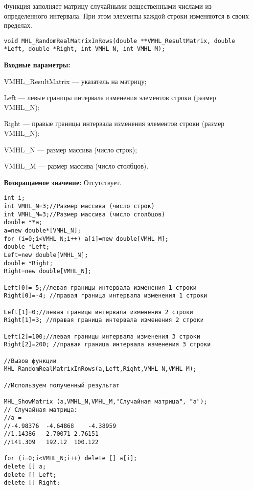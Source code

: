 \documentclass[a4paper,12pt]{article}
\begin{document}
Функция заполняет матрицу случайными вещественными числами из определенного интервала. При этом элементы каждой строки изменяются в своих пределах.


\begin{lstlisting}[label=code_syntax_MHL_RandomRealMatrixInRows,caption=Синтаксис]
void MHL_RandomRealMatrixInRows(double **VMHL_ResultMatrix, double *Left, double *Right, int VMHL_N, int VMHL_M);
\end{lstlisting}

\textbf{Входные параметры:}

 VMHL\_ResultMatrix --- указатель на матрицу;
 
 Left --- левые границы интервала изменения элементов строки (размер VMHL\_N);
 
 Right --- правые границы интервала изменения элементов строки (размер VMHL\_N);
 
 VMHL\_N --- размер массива (число строк);
 
 VMHL\_M --- размер массива (число столбцов).

\textbf{Возвращаемое значение:}
Отсутствует.


\begin{lstlisting}[label=code_use_MHL_RandomRealMatrixInRows,caption=Пример использования]
int i;
int VMHL_N=3;//Размер массива (число строк)
int VMHL_M=3;//Размер массива (число столбцов)
double **a;
a=new double*[VMHL_N];
for (i=0;i<VMHL_N;i++) a[i]=new double[VMHL_M];
double *Left;
Left=new double[VMHL_N];
double *Right;
Right=new double[VMHL_N];

Left[0]=-5;//левая границы интервала изменения 1 строки
Right[0]=-4; //правая граница интервала изменения 1 строки

Left[1]=0;//левая границы интервала изменения 2 строки
Right[1]=3; //правая граница интервала изменения 2 строки

Left[2]=100;//левая границы интервала изменения 3 строки
Right[2]=200; //правая граница интервала изменения 3 строки

//Вызов функции
MHL_RandomRealMatrixInRows(a,Left,Right,VMHL_N,VMHL_M);

//Используем полученный результат

MHL_ShowMatrix (a,VMHL_N,VMHL_M,"Случайная матрица", "a");
// Случайная матрица:
//a =
//-4.98376	-4.64868	-4.38959
//1.14386	2.70071	2.76151
//141.309	192.12	100.122

for (i=0;i<VMHL_N;i++) delete [] a[i];
delete [] a;
delete [] Left;
delete [] Right;
\end{lstlisting}
\end{document}
